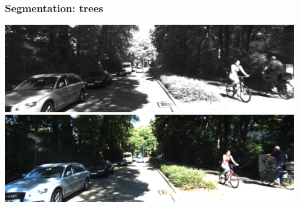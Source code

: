 \documentclass[xcolor=table,usenames,dvipsnames]{beamer}
\begin{document}
\begin{frame}
\frametitle{Segmentation: trees}
\includegraphics[width = 0.95\textwidth]{img/trees_picture.png}
\includegraphics[width = 0.95\textwidth]{img/coloured_trees_picture.png}
\end{frame}
\end{document}
